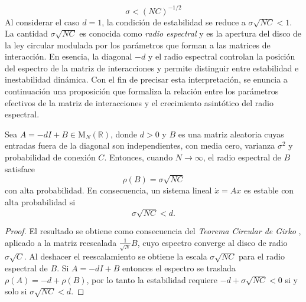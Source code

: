 \begin{equation}\label{eqn:paramMay}
	\sigma<(NC)^{-1/2}
\end{equation}
Al considerar el caso $d=1$, la condición de estabilidad se reduce a $\sigma\sqrt{NC}<1$. La cantidad $\sigma\sqrt{NC}$ es conocida como \textit{radio espectral} y es la apertura del disco de la ley circular modulada por los parámetros que forman a las matrices de interacción. En esencia, la diagonal $-d$ y el radio espectral controlan la posición del espectro de la matriz de interacciones y permite distinguir entre estabilidad e inestabilidad dinámica. Con el fin de precisar esta interpretación, se enuncia a continuación una proposición que formaliza la relación entre los parámetros efectivos de la matriz de interacciones y el crecimiento asintótico del radio espectral.
\begin{proposición}\label{prop:paramMay}
	Sea $A=-dI+B\in\mathrm{M}_N(\mathbb{R})$, donde $d>0$ y $B$ es una matriz aleatoria cuyas entradas fuera de la diagonal son independientes, con media cero, varianza $\sigma^2$ y probabilidad de conexión $C$. Entonces, cuando $N\to\infty$, el radio espectral de $B$ satisface
	$$\rho(B) = \sigma\sqrt{NC}$$%
	con alta probabilidad. En consecuencia, un sistema lineal $\dot{x}=Ax$ es estable con alta probabilidad si
	$$\sigma\sqrt{NC}<d.$$
\end{proposición}
\begin{proof}
	El resultado se obtiene como consecuencia del \textit{Teorema Circular de Girko} \cite{girko1985circular}, aplicado a la matriz reescalada $\frac{1}{\sqrt{N}}B$, cuyo espectro converge al disco de radio $\sigma\sqrt{C}$. Al deshacer el reescalamiento se obtiene la escala $\sigma\sqrt{NC}$ para el radio espectral de $B$. Si $A=-dI+B$ entonces el espectro se traslada $\rho(A)=-d+\rho(B)$, por lo tanto la estabilidad requiere $-d+\sigma\sqrt{NC}<0$ si y solo si $\sigma\sqrt{NC}<d$.
\end{proof}



